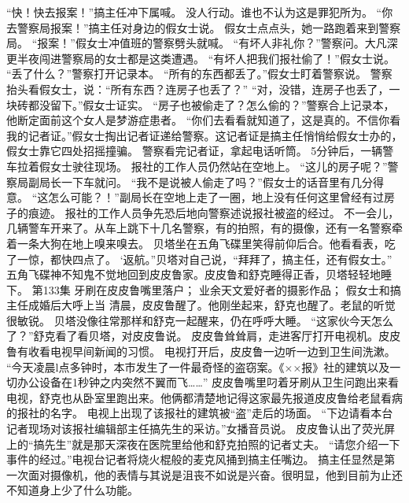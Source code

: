 \documentclass[a4paper,12pt,UTF8,twoside]{ctexbook}
\begin{document}
        “快！快去报案！”搞主任冲下属喊。 
        没人行动。谁也不认为这是罪犯所为。 
        “你去警察局报案！”搞主任对身边的假女士说。 
        假女士点点头，她一路跑着来到警察局。 
        “报案！”假女士冲值班的警察劈头就喊。 
        “有坏人非礼你？”警察问。大凡深更半夜闯进警察局的女士都是这类遭遇。 
        “有坏人把我们报社偷了！”假女士说。 
        “丢了什么？”警察打开记录本。 
        “所有的东西都丢了。”假女士盯着警察说。 
        警察抬头看假女士，说：“所有东西？连房子也丢了？” 
        “对，没错，连房子也丢了，一块砖都没留下。”假女士证实。 
        “房子也被偷走了？怎么偷的？”警察合上记录本，他断定面前这个女人是梦游症患者。 
        “你们去看看就知道了，这是真的。不信你看我的记者证。”假女士掏出记者证递给警察。这记者证是搞主任悄悄给假女士办的，假女士靠它四处招摇撞骗。 
       警察看完记者证，拿起电话听筒。 
        5分钟后，一辆警车拉着假女士驶往现场。 
        报社的工作人员仍然站在空地上。 
        “这儿的房子呢？”警察局副局长一下车就问。 
        “我不是说被人偷走了吗？”假女士的话音里有几分得意。 
        “这怎么可能？！”副局长在空地上走了一圈，地上没有任何这里曾经有过房子的痕迹。 
        报社的工作人员争先恐后地向警察述说报社被盗的经过。 
        不一会儿，几辆警车开来了。从车上跳下十几名警察，有的拍照，有的摄像，还有一名警察牵着一条大狗在地上嗅来嗅去。 
        贝塔坐在五角飞碟里笑得前仰后合。他看看表，吃了一惊，都快四点了。 
        ‘返航。”贝塔对自己说，“拜拜了，搞主任，还有假女士。” 
        五角飞碟神不知鬼不觉地回到皮皮鲁家。皮皮鲁和舒克睡得正香，贝塔轻轻地睡下。   第133集 
        牙刷在皮皮鲁嘴里落户； 
        业余天文爱好者的摄影作品； 
        假女士和搞主任成婚后大呼上当   
        清晨，皮皮鲁醒了。他刚坐起来，舒克也醒了。老鼠的听觉很敏锐。 
        贝塔没像往常那样和舒克一起醒来，仍在呼呼大睡。 
        “这家伙今天怎么了？”舒克看了看贝塔，对皮皮鲁说。 
        皮皮鲁耸耸肩，走进客厅打开电视机。皮皮鲁有收看电视早间新闻的习惯。 
        电视打开后，皮皮鲁一边听一边到卫生间洗漱。 
        “今天凌晨l点多钟时，本市发生了一件最奇怪的盗窃案。《××报》社的建筑以及一切办公设备在1秒钟之内突然不翼而飞……” 
        皮皮鲁嘴里叼着牙刷从卫生问跑出来看电视，舒克也从卧室里跑出来。他俩都清楚地记得这家最先报道皮皮鲁给老鼠看病的报社的名字。 
        电视上出现了该报社的建筑被“盗”走后的场面。 
        “下边请看本台记者现场对该报社编辑部主任搞先生的采访。”女播音员说。 
        皮皮鲁认出了荧光屏上的“搞先生”就是那天深夜在医院里给他和舒克拍照的记者丈夫。 
        “请您介绍一下事件的经过。”电视台记者将烧火棍般的麦克风捅到搞主任嘴边。 
        搞主任显然是第一次面对摄像机，他的表情与其说是沮丧不如说是兴奋。很明显，他到目前为止还不知道身上少了什么功能。 
\end{document}
